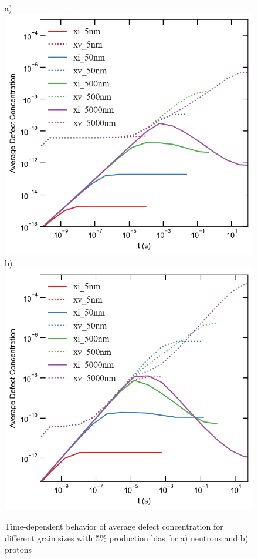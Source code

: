 \documentclass[utf8]{frontiersSCNS} %
\begin{document}
    \begin{figure}[h!]  %
        \centering
        a)\includegraphics[scale=0.55]{average_concentration_neutron_5_size}
        \qquad
        b)\includegraphics[scale=0.55]{average_concentration_high_neutron_5_size}
        \caption{Time-dependent behavior of average defect concentration for different grain sizes with 5\% production bias for a) neutrons and b) protons}
        \label{figure:average_concentrations_neutron_5}
    \end{figure}
\end{document}
